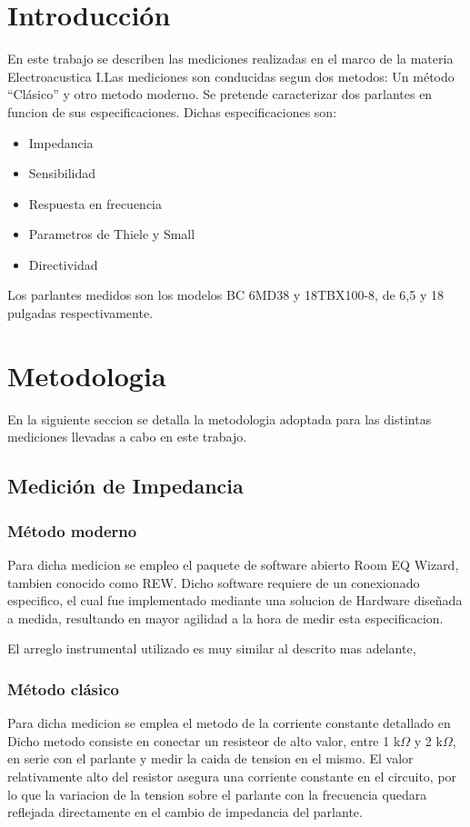 \documentclass[]{article}
\begin{document}
\begin{multicols}{2}
\section{Introducción}
En este trabajo se describen las mediciones realizadas en el marco de la materia
Electroacustica I.Las mediciones son conducidas segun dos metodos: Un método ``Clásico'' y otro metodo
moderno. Se pretende caracterizar dos parlantes en funcion de sus especificaciones.
Dichas especificaciones son:
\begin{itemize}
  \item Impedancia
  \item Sensibilidad
  \item Respuesta en frecuencia
  \item Parametros de Thiele y Small
  \item{Directividad}
\end{itemize}

Los parlantes medidos son los modelos BC 6MD38 y 18TBX100-8, de 6,5 y 18
pulgadas respectivamente.
\section{Metodologia}
En la siguiente seccion se detalla la metodologia adoptada para las distintas
mediciones llevadas a cabo en este trabajo.

\subsection{Medición de Impedancia}

\subsubsection{Método moderno}
\label{subsec: z moderno}
Para dicha medicion se empleo el paquete de software abierto Room EQ Wizard, tambien
conocido como REW. Dicho software requiere de un conexionado especifico, el cual
fue implementado mediante una solucion de Hardware diseñada a medida, resultando
en mayor agilidad a la hora de medir esta especificacion.

El arreglo instrumental utilizado es muy similar al descrito mas adelante,

\subsubsection{Método clásico}
Para dicha medicion se emplea el metodo de la corriente constante detallado en \cite{Ruffa}
Dicho metodo consiste en conectar un resisteor de alto valor, entre 1 k$\Omega$ y
2 k$\Omega$, en serie con el parlante y medir la caida de tension en el mismo.
El valor relativamente alto del resistor asegura una corriente constante en el
circuito, por lo que la variacion de la tension sobre el parlante con la frecuencia
quedara reflejada directamente en el cambio de impedancia del parlante.


\end{multicols}
\end{document}
